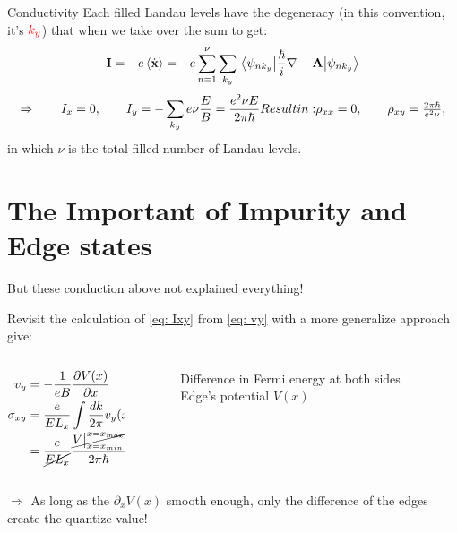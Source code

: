 \documentclass{beamer}
\begin{document}
\begin{frame}{Conductivity}
\quad Each filled Landau levels have the degeneracy (in this convention, it's \({\color{red} k_y}\)) that when we take over the sum to get:
$$\textbf{I} = -e \ev{\dot{\textbf{x}}} = - e \sum_{n = 1}^\nu \sum_{k_y} \ev{\frac{\hbar}{i}\nabla - \textbf{A}}{\psi_{n k_y}}$$
\begin{equation}\label{eq: Ixy}
	\Rightarrow \qquad I_x = 0,\qquad I_y = -\sum_{k_y}e\nu\frac{E}{B} = \frac{e^2 \nu E}{2\pi \hbar}$$
	Result in:
	$$\rho_{xx} = 0, \qquad\rho_{xy} = \frac{2\pi \hbar}{e^2 \nu},
\end{equation}
in which \(\nu\) is the total filled number of Landau levels.
\end{frame}
	\section{The Important of Impurity and Edge states}
\begin{frame}
\begin{center}
	But these conduction above not explained everything!
\end{center}
Revisit the calculation of \eqref{eq: Ixy} from \eqref{eq: vy} with a more generalize approach give:
\begin{columns}
	\begin{column}{0.5\linewidth}
		\begin{align}
			v_y &= - \frac{1}{eB} \pdv{V(x)}{x}\\
			\sigma_{xy} &= \frac{e}{E L_x}\int\frac{dk}{2\pi} v_y (x) \nonumber\\&=\frac{e}{\cancel{E L_x}}\frac{\cancel{V\big|_{x = x_{min}}^{x = x_{max}}}}{2\pi \hbar} = \frac{e^2}{2\pi\hbar}
		\end{align}
	\end{column}
\begin{column}{0.5\linewidth}
	\begin{figure}[!ht]\centering
		\caption{\centering Difference in Fermi energy at both sides Edge's potential \(V(x)\)}
	\end{figure}
\end{column}
\end{columns}
\vspace{0.3cm}
$\Rightarrow$ As long as the \(\partial_x V(x)\) smooth enough, only the difference of the edges create the quantize value!
\end{frame}
\end{document}
